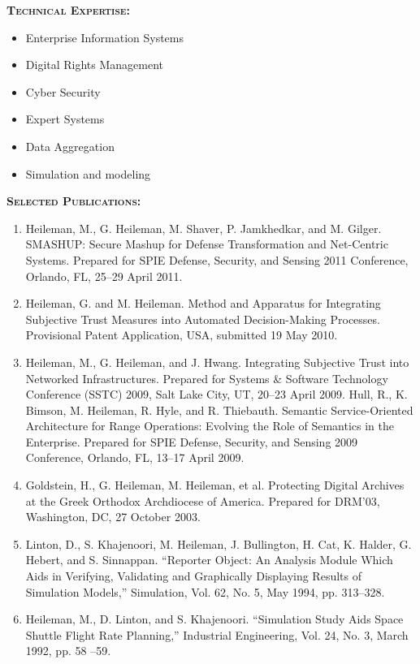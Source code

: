 \documentclass{sbir}
\begin{document}
\vspace{-18pt}
{\textcolor{black}{\makebox[6.5in]{\hrulefill}} 
\textbf{\textsc{Technical Expertise:}}
\vspace{-8pt}
\begin{multicols}{2}
 \begin{itemize}
  \item Enterprise Information Systems
  \item Digital Rights Management
  \item Cyber Security
  \item Expert Systems
  \item Data Aggregation
  \item Simulation and modeling	
 \end{itemize}
\end{multicols}
\vspace{-12pt}
\textbf{\textsc{Selected Publications:}}
\vspace{-8pt}
\begin{enumerate}
\item Heileman, M., G. Heileman, M. Shaver, P. Jamkhedkar, and M. Gilger. SMASHUP: Secure Mashup for Defense Transformation and Net-Centric Systems. Prepared for SPIE Defense, Security, and Sensing 2011 Conference, Orlando, FL, 25--29 April 2011.
\item Heileman, G. and M. Heileman. Method and Apparatus for Integrating Subjective Trust Measures into Automated Decision-Making Processes. Provisional Patent Application, USA, submitted 19 May 2010.
\item Heileman, M., G. Heileman, and J. Hwang. Integrating Subjective Trust into Networked Infrastructures. Prepared for Systems \& Software Technology Conference (SSTC) 2009, Salt Lake City, UT, 20--23 April 2009.
Hull, R., K. Bimson, M. Heileman, R. Hyle, and R. Thiebauth. Semantic Service-Oriented Architecture for Range Operations: Evolving the Role of Semantics in the Enterprise. Prepared for SPIE Defense, Security, and Sensing 2009 Conference, Orlando, FL, 13--17 April 2009.
\item Goldstein, H., G. Heileman, M. Heileman, et al. Protecting Digital Archives at the Greek Orthodox Archdiocese of America. Prepared for DRM'03, Washington, DC, 27 October 2003.
\item Linton, D., S. Khajenoori, M. Heileman, J. Bullington, H. Cat, K. Halder, G. Hebert, and S. Sinnappan. ``Reporter Object: An Analysis Module Which Aids in Verifying, Validating and Graphically Displaying Results of Simulation Models,'' Simulation, Vol. 62, No. 5, May 1994, pp. 313--328.
\item Heileman, M., D. Linton, and S. Khajenoori. ``Simulation Study Aids Space Shuttle Flight Rate Planning,'' Industrial Engineering, Vol. 24, No. 3, March 1992, pp. 58 --59.


\end{enumerate}}
\end{document}
